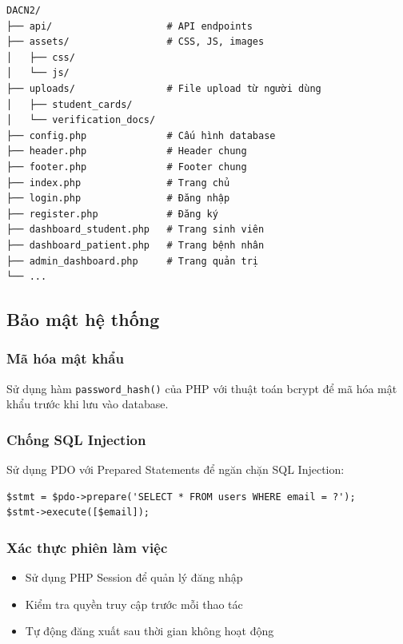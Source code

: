 \documentclass[13pt,a4paper]{extreport}
\begin{document}
\begin{verbatim}
DACN2/
├── api/                    # API endpoints
├── assets/                 # CSS, JS, images
│   ├── css/
│   └── js/
├── uploads/                # File upload từ người dùng
│   ├── student_cards/
│   └── verification_docs/
├── config.php              # Cấu hình database
├── header.php              # Header chung
├── footer.php              # Footer chung
├── index.php               # Trang chủ
├── login.php               # Đăng nhập
├── register.php            # Đăng ký
├── dashboard_student.php   # Trang sinh viên
├── dashboard_patient.php   # Trang bệnh nhân
├── admin_dashboard.php     # Trang quản trị
└── ...
\end{verbatim}

\subsection{Bảo mật hệ thống}

\subsubsection{Mã hóa mật khẩu}

Sử dụng hàm \texttt{password\_hash()} của PHP với thuật toán bcrypt để mã hóa mật khẩu trước khi lưu vào database.

\subsubsection{Chống SQL Injection}

Sử dụng PDO với Prepared Statements để ngăn chặn SQL Injection:

\begin{verbatim}
$stmt = $pdo->prepare('SELECT * FROM users WHERE email = ?');
$stmt->execute([$email]);
\end{verbatim}

\subsubsection{Xác thực phiên làm việc}

\begin{itemize}
    \item Sử dụng PHP Session để quản lý đăng nhập
    \item Kiểm tra quyền truy cập trước mỗi thao tác
    \item Tự động đăng xuất sau thời gian không hoạt động
\end{itemize}
\end{document}
